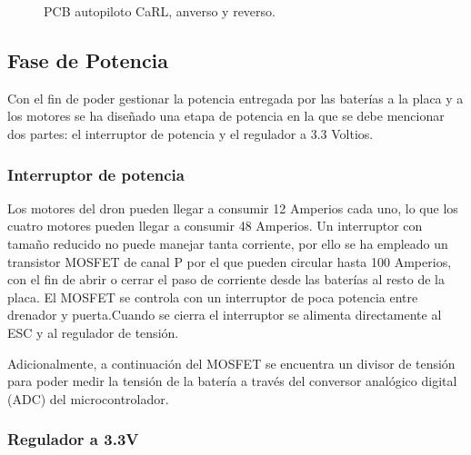 \begin{figure}[htb!]
\begin{subfigure}{0.49\textwidth}
	\end{subfigure}
	
	\caption{PCB autopiloto CaRL, anverso y reverso.}
	\label{PCB}
	
	
\end{figure}


\subsection{Fase de Potencia}

Con el fin de poder gestionar la potencia entregada por las baterías a la placa y a los motores se ha diseñado una etapa de potencia en la que se debe mencionar dos partes: el interruptor de potencia y el regulador a 3.3 Voltios.

\subsubsection{Interruptor de potencia}

Los motores del dron pueden llegar a consumir 12 Amperios cada uno, lo que los cuatro motores pueden llegar a consumir 48 Amperios. Un interruptor con tamaño reducido no puede manejar tanta corriente, por ello se ha empleado un transistor MOSFET de canal P por el que pueden circular hasta 100 Amperios, con el fin de abrir o cerrar el paso de corriente desde las baterías al resto de la placa. El MOSFET se controla con un interruptor de poca potencia entre drenador y puerta.Cuando se cierra el interruptor se alimenta directamente al ESC y al regulador de tensión.

Adicionalmente, a continuación del MOSFET se encuentra un divisor de tensión para poder medir la tensión de la batería a través del conversor analógico digital (ADC) del microcontrolador.   


\subsubsection{Regulador a 3.3V}

